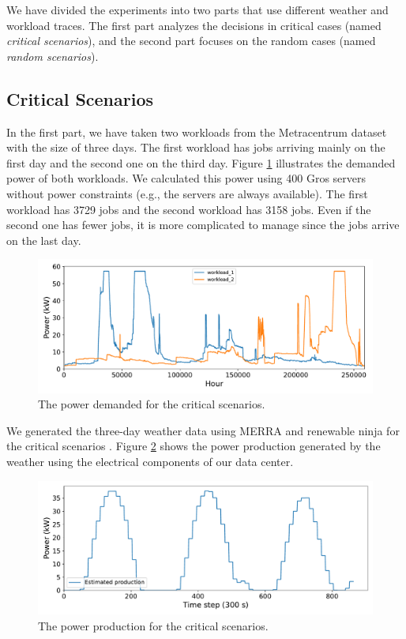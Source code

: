 We have divided the experiments into two parts that use different weather and workload traces. The first part analyzes the decisions in critical cases (named \emph{critical scenarios}), and the second part focuses on the random cases (named \emph{random scenarios}). 

\subsection{Critical Scenarios}

In the first part, we have taken two workloads from the Metracentrum dataset with the size of three days. The first workload has jobs arriving mainly on the first day and the second one on the third day. Figure \ref{fig:critical_workload} illustrates the demanded power of both workloads. We calculated this power using 400 Gros servers without power constraints (e.g., the servers are always available). The first workload has 3729 jobs and the second workload has 3158 jobs. Even if the second one has fewer jobs, it is more complicated to manage since the jobs arrive on the last day.

\begin{figure}[!htb]
    \centering
    \includegraphics[scale=0.58]{Images/Compensations/critical_jobs_arriving.pdf}
    \caption{The power demanded for the critical scenarios.}
    \label{fig:critical_workload}
\end{figure}

We generated the three-day weather data using MERRA and renewable ninja for the critical scenarios \cite{rienecker2011merra, pfenninger2016long, staffell2016using}. Figure \ref{fig:critical_weather} shows the power production generated by the weather using the electrical components of our data center. 

\begin{figure}[!htb]
    \centering
    \includegraphics[scale=0.58]{Images/Compensations/critical_power_production.pdf}
    \caption{The power production for the critical scenarios.}
    \label{fig:critical_weather}
\end{figure}

